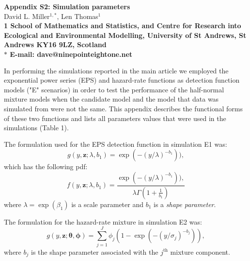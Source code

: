\documentclass[10pt]{article}
\date{}
\begin{document}
\begin{flushleft}
{\Large
\textbf{Appendix S2: Simulation parameters}
}
\\
David L. Miller$^{1,\ast}$,
Len Thomas$^{1}$
\\
\bf{1} School of Mathematics and Statistics, and Centre for Research into Ecological and Environmental Modelling, University of St Andrews, St Andrews KY16 9LZ, Scotland
\\
$\ast$ E-mail: dave@ninepointeightone.net
\end{flushleft}

In performing the simulations reported in the main article we employed the exponential power series (EPS) and hazard-rate functions as detection function models ("E" scenarios) in order to test the performance of the half-normal mixture models when the candidate model and the model that data was simulated from were not the same. This appendix describes the functional forms of these two functions and lists all parameters values that were used in the simulations (Table 1).

The formulation used for the EPS detection function in simulation E1 was:
\begin{equation*}
g(y,\mathbf{z}; \lambda, b_1) =  \exp(-(y/\lambda)^{-b_1})),
\end{equation*}
which has the following pdf:
\begin{equation*}
f(y,\mathbf{z}; \lambda, b_1) =  \frac{\exp(-(y/\lambda)^{-b_1})),}{\lambda\Gamma(1+\frac{1}{b_1})}
\end{equation*}
where $\lambda=\exp(\beta_1)$ is a scale parameter and $b_1$ is a \textit{shape parameter}.

The formulation for the hazard-rate mixture in simulation E2 was:
\begin{equation*}
g(y,\mathbf{z}; \boldsymbol{\theta}, \boldsymbol{\phi}) = \sum_{j=1}^J \phi_j (1-\exp(-(y/\sigma_j)^{-b_j})),
\end{equation*}
where $b_j$ is the shape parameter associated with the $j^\text{th}$ mixture component.
\end{document}
